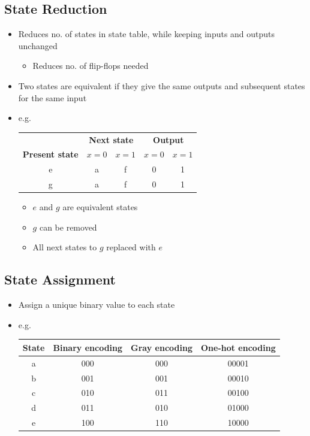 \documentclass[a4paper]{article}
\begin{document}
\subsection{State Reduction}
\begin{itemize}
    \item Reduces no. of states in state table, while keeping inputs and outputs unchanged
    \begin{itemize}[label=$\circ$]
        \item Reduces no. of flip-flops needed
    \end{itemize}
    \item Two states are equivalent if they give the same outputs and subsequent states for the same input
    \item e.g.
    \begin{minipage}{0.5\textwidth}
        \begin{table}[H]
        \centering
        \begin{tabular}{ccccc}
         & \multicolumn{2}{c}{\textbf{Next state}} & \multicolumn{2}{c}{\textbf{Output}} \\
        \textbf{Present state} & $x = 0$ & $x = 1$ & $x = 0$ & $x = 1$ \\ \hline
        e & a & f & 0 & 1 \\
        g & a & f & 0 & 1
        \end{tabular}
        \end{table}
    \end{minipage}
    \begin{minipage}{0.5\textwidth}
    \begin{itemize}[label=$\bullet$]
        \item $e$ and $g$ are equivalent states
        \item $g$ can be removed
        \item All next states to $g$ replaced with $e$
    \end{itemize}
    \end{minipage}
\end{itemize}

\newpage
\subsection{State Assignment}
\begin{itemize}
    \item Assign a unique binary value to each state
    \item e.g.
    \begin{table}[H]
    \centering
    \begin{tabular}{cccc}
    \textbf{State} & \textbf{Binary encoding} & \textbf{Gray encoding} & \textbf{One-hot encoding} \\ \hline
    a & 000 & 000 & 00001 \\
    b & 001 & 001 & 00010 \\
    c & 010 & 011 & 00100 \\
    d & 011 & 010 & 01000 \\
    e & 100 & 110 & 10000
    \end{tabular}
    \end{table}
\end{itemize}
\end{document}
